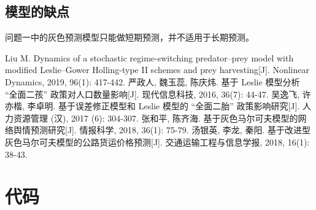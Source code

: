 \documentclass{whutmod}
\begin{document}
		\subsection{模型的缺点}
问题一中的灰色预测模型只能做短期预测，并不适用于长期预测。

 
	\newpage	%
	\nocite{*}		%
	\begin{thebibliography}{9}%
		Liu M. Dynamics of a stochastic regime-switching predator–prey model with modified Leslie–Gower Holling-type II schemes and prey harvesting[J]. Nonlinear Dynamics, 2019, 96(1): 417-442.
		严政人, 魏玉蕊, 陈庆炜. 基于 Leslie 模型分析 “全面二孩” 政策对人口数量影响[J]. 现代信息科技, 2016, 36(7): 44-47.
		吴逸飞, 许亦楷, 李卓明. 基于误差修正模型和 Leslie 模型的 “全面二胎” 政策影响研究[J]. 人力资源管理 (汉), 2017 (6): 304-307.
		张和平, 陈齐海. 基于灰色马尔可夫模型的网络舆情预测研究[J]. 情报科学, 2018, 36(1): 75-79.
		汤银英, 李龙, 秦阳. 基于改进型灰色马尔可夫模型的公路货运价格预测[J]. 交通运输工程与信息学报, 2018, 16(1): 38-43.
	\end{thebibliography}

	\newpage
	\appendix %
	\section{代码}
\end{document}
